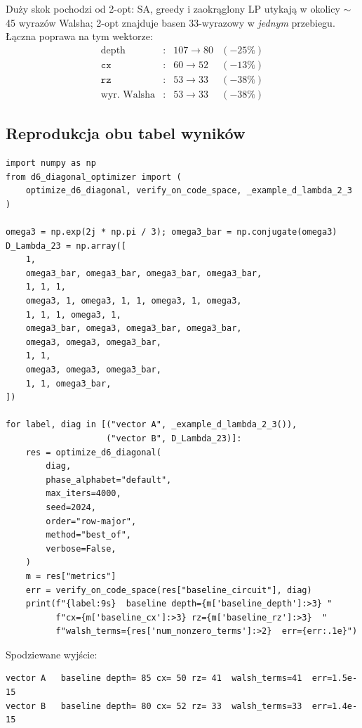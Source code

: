 \documentclass[11pt,a4paper]{article}
\newcommand{\1}{\mathbf{1}}
\newcommand{\code}[1]{\texttt{#1}}
\begin{document}
\noindent
Duży skok pochodzi od 2-opt: SA, greedy i zaokrąglony LP utykają
w okolicy $\sim$45 wyrazów Walsha; 2-opt znajduje basen 33-wyrazowy w
\emph{jednym} przebiegu. Łączna poprawa na tym wektorze:
\[
\begin{array}{rcccc}
\mathrm{depth} & : & 107 \to 80         & (-25\%) \\
\code{cx}      & : &  60 \to 52         & (-13\%) \\
\code{rz}      & : &  53 \to 33         & (-38\%) \\
\text{wyr.\ Walsha} & : & 53 \to 33     & (-38\%)
\end{array}
\]

\subsection{Reprodukcja obu tabel wyników}

\begin{lstlisting}
import numpy as np
from d6_diagonal_optimizer import (
    optimize_d6_diagonal, verify_on_code_space, _example_d_lambda_2_3
)

omega3 = np.exp(2j * np.pi / 3); omega3_bar = np.conjugate(omega3)
D_Lambda_23 = np.array([
    1,
    omega3_bar, omega3_bar, omega3_bar, omega3_bar,
    1, 1, 1,
    omega3, 1, omega3, 1, 1, omega3, 1, omega3,
    1, 1, 1, omega3, 1,
    omega3_bar, omega3, omega3_bar, omega3_bar,
    omega3, omega3, omega3_bar,
    1, 1,
    omega3, omega3, omega3_bar,
    1, 1, omega3_bar,
])

for label, diag in [("vector A", _example_d_lambda_2_3()),
                    ("vector B", D_Lambda_23)]:
    res = optimize_d6_diagonal(
        diag,
        phase_alphabet="default",
        max_iters=4000,
        seed=2024,
        order="row-major",
        method="best_of",
        verbose=False,
    )
    m = res["metrics"]
    err = verify_on_code_space(res["baseline_circuit"], diag)
    print(f"{label:9s}  baseline depth={m['baseline_depth']:>3} "
          f"cx={m['baseline_cx']:>3} rz={m['baseline_rz']:>3}  "
          f"walsh_terms={res['num_nonzero_terms']:>2}  err={err:.1e}")
\end{lstlisting}

\noindent
Spodziewane wyjście:
\begin{lstlisting}
vector A   baseline depth= 85 cx= 50 rz= 41  walsh_terms=41  err=1.5e-15
vector B   baseline depth= 80 cx= 52 rz= 33  walsh_terms=33  err=1.4e-15
\end{lstlisting}
\end{document}

